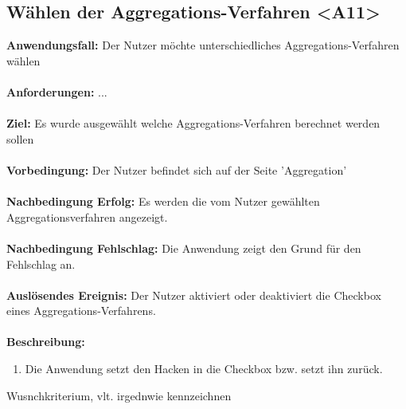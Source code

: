 \documentclass[parskip=full]{scrartcl} %
\begin{document}
\subsection*{Wählen der Aggregations-Verfahren <A11>}
\textbf{Anwendungsfall:} Der Nutzer möchte unterschiedliches Aggregations-Verfahren wählen\\\\
\textbf{Anforderungen:} ...\\\\
\textbf{Ziel:} Es wurde ausgewählt welche Aggregations-Verfahren berechnet werden sollen \\\\
\textbf{Vorbedingung:} Der Nutzer befindet sich auf der Seite 'Aggregation'\\\\
\textbf{Nachbedingung Erfolg:} Es werden die vom Nutzer gewählten Aggregationsverfahren angezeigt.\\\\
\textbf{Nachbedingung Fehlschlag:} Die Anwendung zeigt den Grund für den Fehlschlag an. \\\\
\textbf{Auslösendes Ereignis:} Der Nutzer aktiviert oder deaktiviert die Checkbox eines Aggregations-Verfahrens. \\\\
\textbf{Beschreibung:}
\begin{enumerate}
    \item Die Anwendung setzt den Hacken in die Checkbox bzw. setzt ihn zurück.
\end{enumerate}
\newpage



Wusnchkriterium, vlt. irgednwie kennzeichnen
\end{document}
